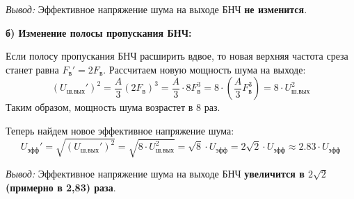 \textit{Вывод:} Эффективное напряжение шума на выходе БНЧ \textbf{не изменится}.

\vspace{1em}
\textbf{б) Изменение полосы пропускания БНЧ:}

Если полосу пропускания БНЧ расширить вдвое, то новая верхняя частота среза станет равна $F_{\text{в}}' = 2F_{\text{в}}$. 
Рассчитаем новую мощность шума на выходе:
\begin{equation*}
(U_{\text{ш.вых}}')^2 = \frac{A}{3} (2F_{\text{в}})^3 = \frac{A}{3} \cdot 8F_{\text{в}}^3 = 8 \cdot \left( \frac{A}{3} F_{\text{в}}^3 \right) = 8 \cdot U_{\text{ш.вых}}^2
\end{equation*}
Таким образом, мощность шума возрастет в 8 раз. 

Теперь найдем новое эффективное напряжение шума:
\begin{equation*}
U_{\text{эфф}}' = \sqrt{(U_{\text{ш.вых}}')^2} = \sqrt{8 \cdot U_{\text{ш.вых}}^2} = \sqrt{8} \cdot U_{\text{эфф}} = 2\sqrt{2} \cdot U_{\text{эфф}} \approx 2.83 \cdot U_{\text{эфф}}
\end{equation*}

\textit{Вывод:} Эффективное напряжение шума на выходе БНЧ \textbf{увеличится в $2\sqrt{2}$ (примерно в 2,83) раза}.